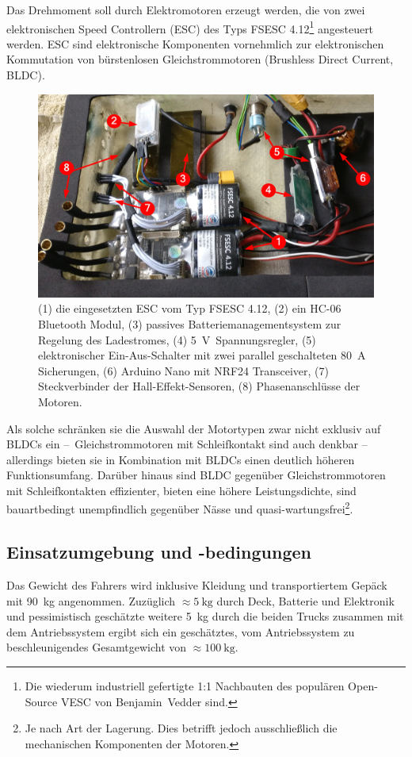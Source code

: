 			Das Drehmoment soll durch Elektromotoren erzeugt werden, die von zwei elektronischen Speed Controllern (ESC) des Typs \textsc{FSESC 4.12}\footnote{\hspace{1mm} Die wiederum industriell gefertigte 1:1 Nachbauten des populären Open-Source \textsc{VESC} von Benjamin~Vedder sind.} angesteuert werden.
			ESC sind elektronische Komponenten vornehmlich zur elektronischen Kommutation von bürstenlosen Gleichstrommotoren (Brushless Direct Current, BLDC).
			\begin{figure}[h]
				\centering
				\includegraphics[width=.9\textwidth]{Footage/Pictures/Electronics.jpg}
				\caption[Eingesetzte ESC]{(1) die eingesetzten ESC vom Typ \textsc{FSESC 4.12}, (2) ein HC-06 Bluetooth Modul, (3) passives Batteriemanagementsystem zur Regelung des Ladestromes, (4) \qty{5}{\volt}~Spannungsregler, (5) elektronischer Ein-Aus-Schalter mit zwei parallel geschalteten \qty{80}{\ampere} Sicherungen, (6) Arduino Nano mit NRF24 Transceiver, (7) Steckverbinder der Hall-Effekt-Sensoren, (8) Phasenanschlüsse der Motoren.}\label{fig:electronics}
			\end{figure}
			Als solche schränken sie die Auswahl der Motortypen zwar nicht exklusiv auf BLDCs ein --~Gleichstrommotoren mit Schleifkontakt sind auch denkbar -- allerdings bieten sie in Kombination mit BLDCs einen deutlich höheren Funktionsumfang.
			Darüber hinaus sind BLDC gegenüber Gleichstrommotoren mit Schleifkontakten effizienter, bieten eine höhere Leistungsdichte, sind bauartbedingt unempfindlich gegenüber Nässe und quasi-wartungsfrei\footnote{\hspace{1mm} Je nach Art der Lagerung. Dies betrifft jedoch ausschließlich die mechanischen Komponenten der Motoren.}.
		\subsection{Einsatzumgebung und -bedingungen}
			Das Gewicht des Fahrers wird inklusive Kleidung und transportiertem Gepäck mit \qty{90}{\kilo\gram} angenommen.
			Zuzüglich \(\approx \qty{5}{\kilo\gram}\) durch Deck, Batterie und Elektronik und pessimistisch geschätzte weitere \qty{5}{\kilo\gram} durch die beiden Trucks zusammen mit dem Antriebssystem ergibt sich ein geschätztes, vom Antriebssystem zu beschleunigendes Gesamtgewicht von \(\approx \qty{100}{\kilo\gram}\).

